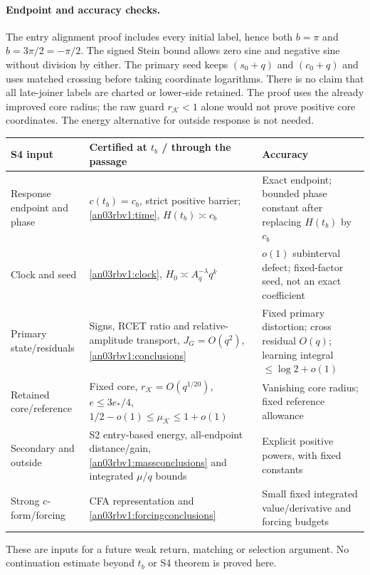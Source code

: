 \documentclass[11pt]{article}
\numberwithin{equation}{section}
\theoremstyle{remark}\newtheorem{remark}[theorem]{Remark}
\newcommand{\KK}{\mathcal K}
\begin{document}
\paragraph{Endpoint and accuracy checks.}
The entry alignment proof includes every initial label, hence both
$b=\pi$ and $b=3\pi/2=-\pi/2$. The signed Stein bound allows
zero sine and negative sine without division by either.
The primary seed keeps $(s_0+q)$ and $(c_0+q)$ and uses matched
crossing before taking coordinate logarithms. There is no claim
that all late-joiner labels are charted or lower-side retained.
The proof uses the already improved core radius; the raw guard
$r_{\KK}<1$ alone would not prove positive core coordinates.
The energy alternative for outside response is not needed.

\begin{longtable}{>{\raggedright\arraybackslash}p{}
 >{\raggedright\arraybackslash}p{}
 >{\raggedright\arraybackslash}p{}}
\toprule
S4 input & Certified at $t_b$ / through the passage & Accuracy\\\midrule
Response endpoint and phase & $c(t_b)=c_b$, strict positive barrier;
\eqref{an03rbv1:time}, $H(t_b)\asymp c_b$ & Exact endpoint;
bounded phase constant after replacing $H(t_b)$ by $c_b$\\[3pt]
Clock and seed & \eqref{an03rbv1:clock},
$H_0\asymp A_q^{-\lambda}q^k$ & $o(1)$ subinterval defect;
fixed-factor seed, not an exact coefficient\\[3pt]
Primary state/residuals & Signs, RCET ratio and relative-amplitude
transport, $J_G=O(q^2)$, \eqref{an03rbv1:conclusions} &
Fixed primary distortion; cross residual $O(q)$;
learning integral $\le\log2+o(1)$\\[3pt]
Retained core/reference & Fixed core, $r_{\KK}=O(q^{1/20})$,
$e\le3e_*/4$, $1/2-o(1)\le\mu_{\KK}\le1+o(1)$ &
Vanishing core radius; fixed reference allowance\\[3pt]
Secondary and outside & S2 entry-based energy, all-endpoint
distance/gain, \eqref{an03rbv1:massconclusions} and integrated
$\mu/q$ bounds & Explicit positive powers, with fixed constants\\[3pt]
Strong c-form/forcing & CFA representation and
\eqref{an03rbv1:forcingconclusions} & Small fixed integrated
value/derivative and forcing budgets\\
\bottomrule
\end{longtable}
These are inputs for a future weak return, matching or selection
argument. No continuation estimate beyond $t_b$ or S4 theorem
is proved here.
\end{document}
